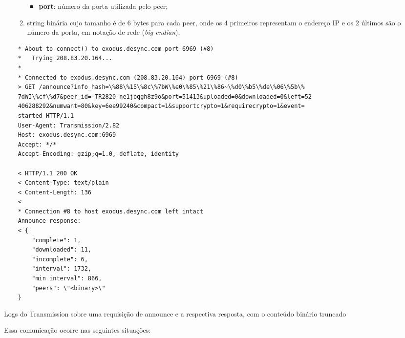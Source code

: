 \begin{itemize}
\begin{enumerate}
\begin{itemize}
            \item \textbf{port}: número da porta utilizada pelo \gls*{peer};
        \end{itemize}

        \item \gls*{string} binária cujo tamanho é de 6 bytes para cada \gls*{peer},
        onde os 4 primeiros representam o endereço IP e os 2 últimos são o número da
        porta, em notação de rede (\emph{big endian});
    \end{enumerate}
\end{itemize}

\begin{listing}[H]
    \begin{verbatim}
    * About to connect() to exodus.desync.com port 6969 (#8)
    *   Trying 208.83.20.164...
    *
    * Connected to exodus.desync.com (208.83.20.164) port 6969 (#8)
    > GET /announce?info_hash=\%88\%15\%8c\%7bW\%e0\%85\%21\%86~\%d0\%b5\%de\%06\%5b\%
    7dWI\%cf\%d7&peer_id=-TR2820-ne1joqgh8z9o&port=51413&uploaded=0&downloaded=0&left=52
    406288292&numwant=80&key=6ee99240&compact=1&supportcrypto=1&requirecrypto=1&event=
    started HTTP/1.1
    User-Agent: Transmission/2.82
    Host: exodus.desync.com:6969
    Accept: */*
    Accept-Encoding: gzip;q=1.0, deflate, identity

    < HTTP/1.1 200 OK
    < Content-Type: text/plain
    < Content-Length: 136
    <
    * Connection #8 to host exodus.desync.com left intact
    Announce response:
    < {
        "complete": 1,
        "downloaded": 11,
        "incomplete": 6,
        "interval": 1732,
        "min interval": 866,
        "peers": \"<binary>\"
    }
    \end{verbatim}

    \caption{Logs do Transmission sobre uma requisição de announce e a respectiva
    resposta, com o conteúdo binário truncado}
    \label{lst:announce}
\end{listing}

Essa comunicação ocorre nas seguintes situações:

